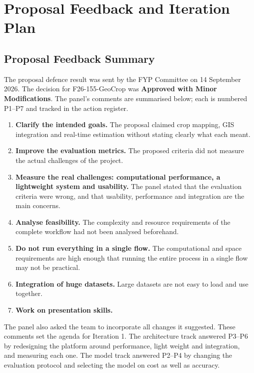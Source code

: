 \chapter{Proposal Feedback and Iteration Plan}

\section{Proposal Feedback Summary}\label{sec:feedback}
The proposal defence result was sent by the FYP Committee on 14 September 2026. The decision for
F26-155-GeoCrop was \textbf{Approved with Minor Modifications}. The panel's comments are summarised
below; each is numbered P1--P7 and tracked in the action register.
\begin{enumerate}[label=\textbf{P\arabic*.}, leftmargin=1.1cm]
  \item \textbf{Clarify the intended goals.} The proposal claimed crop mapping, GIS integration and
        real-time estimation without stating clearly what each meant.
  \item \textbf{Improve the evaluation metrics.} The proposed criteria did not measure the actual
        challenges of the project.
  \item \textbf{Measure the real challenges: computational performance, a lightweight system and
        usability.} The panel stated that the evaluation criteria were wrong, and that usability,
        performance and integration are the main concerns.
  \item \textbf{Analyse feasibility.} The complexity and resource requirements of the complete
        workflow had not been analysed beforehand.
  \item \textbf{Do not run everything in a single flow.} The computational and space requirements are
        high enough that running the entire process in a single flow may not be practical.
  \item \textbf{Integration of huge datasets.} Large datasets are not easy to load and use together.
  \item \textbf{Work on presentation skills.}
\end{enumerate}
The panel also asked the team to incorporate all changes it suggested. These comments set the agenda
for Iteration 1. The architecture track answered P3--P6 by redesigning the platform around
performance, light weight and integration, and measuring each one. The model track answered P2--P4
by changing the evaluation protocol and selecting the model on cost as well as accuracy.

